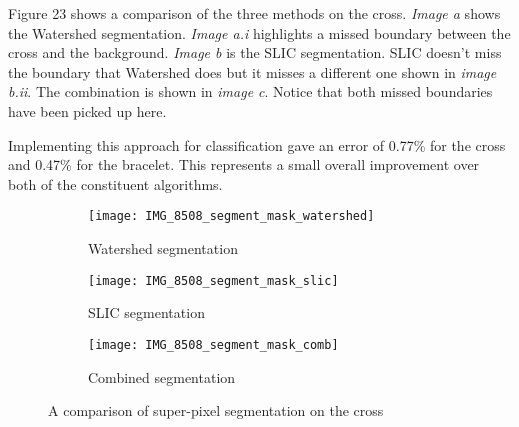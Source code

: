 \documentclass[12pt]{IIBproject}
\begin{document}
Figure 23 shows a comparison of the three methods on the cross. \emph{Image a} shows the Watershed segmentation. \emph{Image a.i} highlights a missed boundary between the cross and the background. \emph{Image b} is the SLIC segmentation. SLIC doesn't miss the boundary that Watershed does but it misses a different one shown in \emph{image b.ii}. The combination is shown in \emph{image c}. Notice that both missed boundaries have been picked up here.

Implementing this approach for classification gave an error of 0.77\% for the cross and 0.47\% for the bracelet. This represents a small overall improvement over both of the constituent algorithms.

 \begin{figure}[H]
\centering
\begin{subfigure}{.5\textwidth}
  \centering
  \texttt{[image: IMG\_8508\_segment\_mask\_watershed]}
  \caption{Watershed segmentation}
  \label{fig:sub2}
\end{subfigure}
\begin{subfigure}{.5\textwidth}
  \centering
  \texttt{[image: IMG\_8508\_segment\_mask\_slic]}
  \caption{SLIC segmentation}
  \label{fig:sub1}
\end{subfigure}%
\begin{subfigure}{.5\textwidth}
  \centering
  \texttt{[image: IMG\_8508\_segment\_mask\_comb]}
  \caption{Combined segmentation}
  \label{fig:sub1}
\end{subfigure}%


\caption{A comparison of super-pixel segmentation on the cross}
\label{fig:test}
\end{figure}
\end{document}
